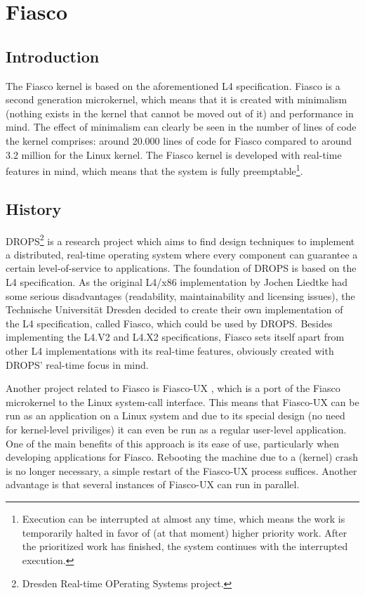 \section{Fiasco}

\subsection{Introduction}
The Fiasco kernel is based on the aforementioned L4 specification. Fiasco is a second generation microkernel, which means that it is created with minimalism (nothing exists in the kernel that cannot be moved out of it) and performance in mind. The effect of minimalism can clearly be seen in the number of lines of code the kernel comprises: around 20.000 lines of code for Fiasco compared to around 3.2 million for the Linux kernel. The Fiasco kernel is developed with real-time features in mind, which means that the system is fully preemptable\footnote{Execution can be interrupted at almost any time, which means the work is temporarily halted in favor of (at that moment) higher priority work. After the prioritized work has finished, the system continues with the interrupted execution.}. 

\subsection{History}
DROPS\footnote{Dresden Real-time OPerating Systems project.} \cite{hartig98drops} is a research project which aims to find design techniques to implement a distributed, real-time operating system where every component can guarantee a certain level-of-service to applications. The foundation of DROPS is based on the L4 specification. As the original L4/x86 implementation by Jochen Liedtke had some serious disadvantages (readability, maintainability and licensing issues), the Technische Universit{\"a}t Dresden decided to create their own implementation of the L4 specification, called Fiasco, which could be used by DROPS. Besides implementing the L4.V2 and L4.X2 specifications, Fiasco sets itself apart from other L4 implementations with its real-time features, obviously created with DROPS' real-time focus in mind.\emptyline

Another project related to Fiasco is Fiasco-UX \cite{schonberg01user}, which is a port of the Fiasco microkernel to the Linux system-call interface. This means that Fiasco-UX can be run as an application on a Linux system and due to its special design (no need for kernel-level priviliges) it can even be run as a regular user-level application. One of the main benefits of this approach is its ease of use, particularly when developing applications for Fiasco. Rebooting the machine due to a (kernel) crash is no longer necessary, a simple restart of the Fiasco-UX process suffices. Another advantage is that several instances of Fiasco-UX can run in parallel.\emptyline

